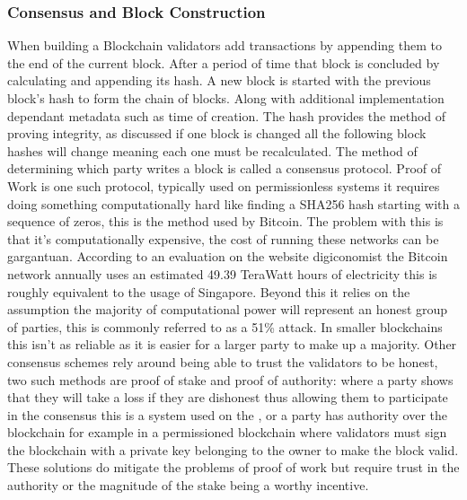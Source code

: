 \documentclass{entcs}
\begin{document}
\subsubsection{Consensus and Block Construction} \label{sec: consensus}

When building a Blockchain validators add transactions by appending them to the end of the current block. After a period of time that block is concluded by calculating and appending its hash. A new block is started with the previous block's hash to form the chain of blocks. Along with additional implementation dependant metadata such as time of creation. The hash provides the method of proving integrity, as discussed if one block is changed all the following block hashes will change meaning each one must be recalculated. The method of determining which party writes a block is called a consensus protocol. 
Proof of Work\cite{BTCWhitepaper} is one such protocol, typically used on permissionless systems it requires doing something computationally hard like finding a SHA256 hash starting with a sequence of zeros, this is the method used by Bitcoin. The problem with this is that it's computationally expensive, the cost of running these networks can be gargantuan. According to an evaluation on the website digiconomist \cite{BTCenergy} the Bitcoin network annually uses an estimated 49.39 TeraWatt hours of electricity this is roughly equivalent to the usage of Singapore. Beyond this it relies on the assumption the majority of computational power will represent an honest group of parties, this is commonly referred to as a 51\% attack\cite{BTCWhitepaper}\cite{baliga2017understanding}. In smaller blockchains this isn't as reliable as it is easier for a larger party to make up a majority. 
Other consensus schemes rely around being able to trust the validators to be honest, two such methods are proof of stake and proof of authority\cite{blockchainBeginners}\cite{baliga2017understanding}: where a party shows that they will take a loss if they are dishonest thus allowing them to participate in the consensus this is a system used on the , or a party has authority over the blockchain for example in a permissioned blockchain where validators must sign the blockchain with a private key belonging to the owner to make the block valid. These solutions do mitigate the problems of proof of work but require trust in the authority or the magnitude of the stake being a worthy incentive.
\end{document}

